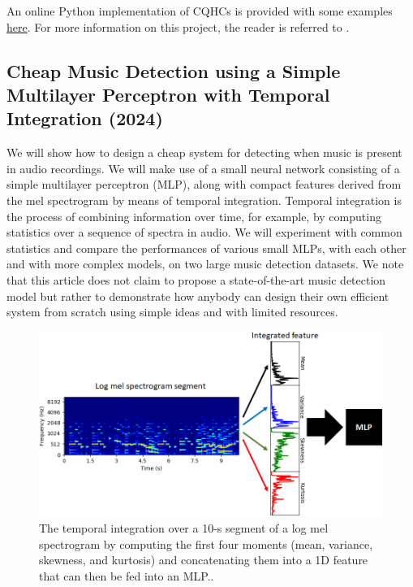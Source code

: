 \documentclass{article}
\begin{document}
An online Python implementation of CQHCs is provided with some examples \href{https://github.com/zafarrafii/CQHC-Python}{here}. For more information on this project, the reader is referred to \cite{article_rafii_may2022}.


\subsection{Cheap Music Detection using a Simple Multilayer Perceptron with Temporal Integration (2024)}
\label{ssec:music_detection}

We will show how to design a cheap system for detecting when music is present in audio recordings. We will make use of a small neural network consisting of a simple multilayer perceptron (MLP), along with compact features derived from the mel spectrogram by means of temporal integration. Temporal integration is the process of combining information over time, for example, by computing statistics over a sequence of spectra in audio. We will experiment with common statistics and compare the performances of various small MLPs, with each other and with more complex models, on two large music detection datasets. We note that this article does not claim to propose a state-of-the-art music detection model but rather to demonstrate how anybody can design their own efficient system from scratch using simple ideas and with limited resources.

\begin{figure}[!htb]
	\centering
	\includegraphics[width=1.0\columnwidth]{Images/temporal_integration.png}
	\caption{The temporal integration over a 10-s segment of a log mel spectrogram by computing the first four moments (mean, variance, skewness, and
kurtosis) and concatenating them into a 1D feature that can then be fed into an MLP..}
	\label{fig:temporal_integration}
\end{figure}
\end{document}
